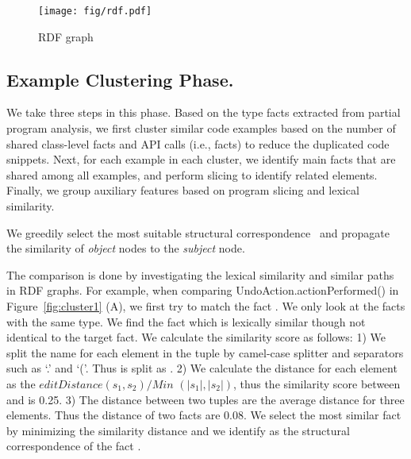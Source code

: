 \begin{figure}[!htb]
    \begin{minipage}{0.5\textwidth}
    \centering
\texttt{[image: fig/rdf.pdf]}
 \end{minipage}%
   \caption{RDF graph}
 \label{fig:rdf}
   \end{figure}


\subsection{Example Clustering Phase.} 

We take three steps in this phase. Based on the type facts extracted from partial program analysis, we first cluster similar code examples based on the number of shared class-level facts and API calls (i.e.,   facts) to reduce the duplicated code snippets. Next, for each example in each cluster, we identify main facts that are shared among all examples, and perform slicing to identify related elements. Finally, we group auxiliary features based on program slicing and lexical similarity.

   We greedily select the most suitable structural correspondence~\cite{Cottrell:jigsaw08} and propagate the similarity of {\it object} nodes to the {\it subject} node. 

 The comparison is done by investigating the lexical similarity and similar paths in RDF graphs. For example, when comparing UndoAction.actionPerformed() in Figure~\ref{fig:cluster1} (A), we first try to match the fact . We only look at the facts with the same type. We find  the fact   which is lexically similar though not identical to the target fact. We calculate the similarity score as follows: 1) We split the name for each element in the tuple by camel-case splitter and separators such as `.' and `('. Thus  is split as .  2) We calculate the distance for each element as the $ editDistance(s_1,s_2)/ Min$ $(|s_1|, |s_2|)$, thus the similarity score between  and  is 0.25. 3) The distance between two tuples are the average distance for three elements. Thus the distance of two facts are 0.08.   We select  the most similar  fact by minimizing the similarity distance and we identify  as the structural correspondence of the fact . 
 
